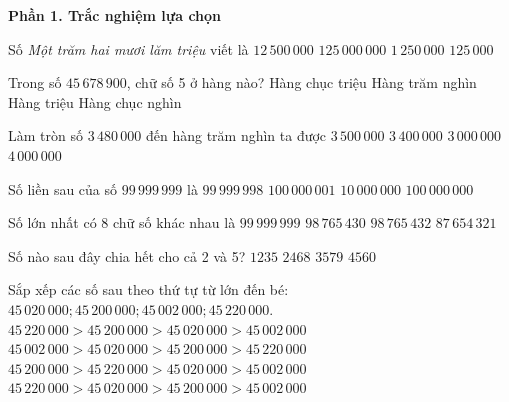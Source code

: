 \textbf{Phần 1. Trắc nghiệm lựa chọn}

\begin{ex} %
Số \textit{Một trăm hai mươi lăm triệu} viết là
\choice
{$12\,500\,000$}
{\True $125\,000\,000$}
{$1\,250\,000$}
{$125\,000$}
\end{ex}

\begin{ex} %
Trong số $45\,678\,900$, chữ số 5 ở hàng nào?
\choice
{Hàng chục triệu}
{Hàng trăm nghìn}
{\True Hàng triệu}
{Hàng chục nghìn}
\end{ex}

\begin{ex} %
Làm tròn số $3\,480\,000$ đến hàng trăm nghìn ta được
\choice
{\True $3\,500\,000$}
{$3\,400\,000$}
{$3\,000\,000$}
{$4\,000\,000$}
\end{ex}

\begin{ex} %
Số liền sau của số $99\,999\,999$ là
\choice
{$99\,999\,998$}
{$100\,000\,001$}
{$10\,000\,000$}
{\True $100\,000\,000$}
\end{ex}

\begin{ex} %
Số lớn nhất có 8 chữ số khác nhau là
\choice
{$99\,999\,999$}
{$98\,765\,430$}
{\True $98\,765\,432$}
{$87\,654\,321$}
\end{ex}

\begin{ex} %
Số nào sau đây chia hết cho cả 2 và 5?
\choice
{$1235$}
{$2468$}
{$3579$}
{\True $4560$}
\end{ex}

\begin{ex} %
Sắp xếp các số sau theo thứ tự từ lớn đến bé: $45\,020\,000; 45\,200\,000; 45\,002\,000; 45\,220\,000$.
\choice
{\True $45\,220\,000 > 45\,200\,000 > 45\,020\,000 > 45\,002\,000$}
{$45\,002\,000 > 45\,020\,000 > 45\,200\,000 > 45\,220\,000$}
{$45\,200\,000 > 45\,220\,000 > 45\,020\,000 > 45\,002\,000$}
{$45\,220\,000 > 45\,020\,000 > 45\,200\,000 > 45\,002\,000$}
\end{ex}


